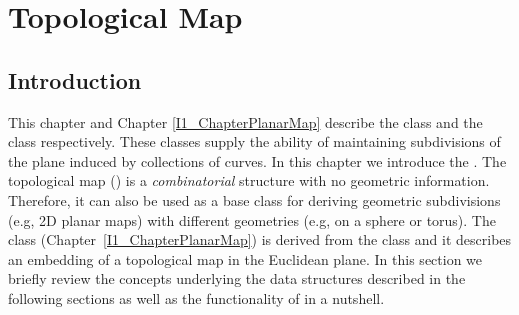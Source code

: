 
\def\Ipe#1{\def\IPEfile{#1}}

\renewcommand{\Re}{{\rm I\!\hspace{-0.025em} R}}
\newcommand{\normal}[1]{\eta_{#1}}
\newenvironment{dfn}{{\vspace*{1ex} \noindent \bf Definition }}{\vspace*{1ex}}
\newcommand{\bigdef}[2]{\index{#1}\begin{dfn} {\rm #2} \end{dfn}}
\newenvironment{proof}{{\em Proof:}}{\hfill{\hfill\rule{2mm}{2mm}}}

\newcommand{\comment}[1]{{\sf * #1 *}}
\newcommand{\ncomment}[1]{\noindent {\sf * #1 * }}

\newcommand{\intsupplanes}{P} 
\def\C{{\cal C}}
\def\G{{\cal G}}
\def\F{{\cal F}}
\def\I{{\cal I}}
\def\U{{\cal U}}
\def\M{{\cal M}}
\def\eps{{\varepsilon}}
\def\bd{{\partial}}
\def\dm{{\cal D}}
\newcommand{\Section}[1]{Section~{\protect\ref{#1}}}
\newcommand{\Chapter}[1]{Chapter~{\protect\ref{#1}}}

\ccParDims

\chapter{Topological Map}
\label{I1_ChapterTopologicalMap}

\section{Introduction}
\label{TPM_sec:intro}

This chapter and Chapter \ref{I1_ChapterPlanarMap} 
describe the  class and the  class
respectively. These classes supply the ability of maintaining subdivisions
of the plane induced by
collections of curves. In this chapter we introduce the . The topological map () is a {\em combinatorial} 
structure with no geometric information. Therefore, it can also be used as a 
base class
for deriving geometric subdivisions (e.g, 2D planar maps) with different 
geometries (e.g, on a sphere or torus).
The  class
(Chapter~\ref{I1_ChapterPlanarMap}) is
derived from the  class and it describes an embedding
of a topological map in the Euclidean
plane. In this section we briefly review the concepts underlying the data
structures described in the following sections as well as the functionality
of  in a nutshell.

